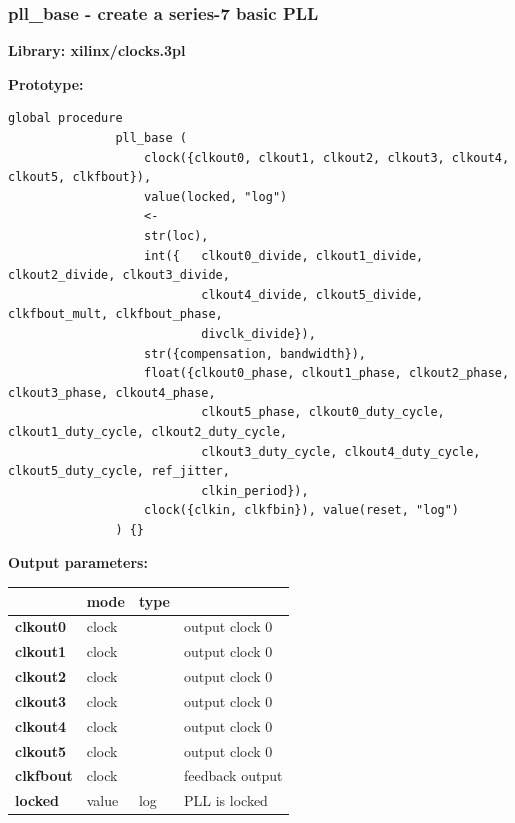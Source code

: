        \subsubsection{pll\_base - create a series-7 basic PLL}\label{sec:lmpllb}
            
            {\bf Library: xilinx/clocks.3pl}

            {\bf Prototype:} \\
            \vsp
            \begin{lstlisting}[gobble=12, language=threepl]
               global procedure
               pll_base (
                   clock({clkout0, clkout1, clkout2, clkout3, clkout4, clkout5, clkfbout}),
                   value(locked, "log")
                   <-
                   str(loc),
                   int({   clkout0_divide, clkout1_divide, clkout2_divide, clkout3_divide,
                           clkout4_divide, clkout5_divide, clkfbout_mult, clkfbout_phase,
                           divclk_divide}),
                   str({compensation, bandwidth}),
                   float({clkout0_phase, clkout1_phase, clkout2_phase, clkout3_phase, clkout4_phase,
                           clkout5_phase, clkout0_duty_cycle, clkout1_duty_cycle, clkout2_duty_cycle,
                           clkout3_duty_cycle, clkout4_duty_cycle, clkout5_duty_cycle, ref_jitter,
                           clkin_period}),
                   clock({clkin, clkfbin}), value(reset, "log")
               ) {}
            \end{lstlisting}

            {\bf Output parameters:} \\
            \begin{tabular}{| l | l | l | l |}
            \hline
                           & mode  & type   & \\
            \hline \hline
            {\bf clkout0}  & clock &         & output clock 0 \\ \hline    
            {\bf clkout1}  & clock &         & output clock 0 \\ \hline    
            {\bf clkout2}  & clock &         & output clock 0 \\ \hline    
            {\bf clkout3}  & clock &         & output clock 0 \\ \hline    
            {\bf clkout4}  & clock &         & output clock 0 \\ \hline    
            {\bf clkout5}  & clock &         & output clock 0 \\ \hline    
            {\bf clkfbout} & clock &         & feedback output \\ \hline   
            {\bf locked}   & value & log     & PLL is locked \\ \hline
            \end{tabular}

